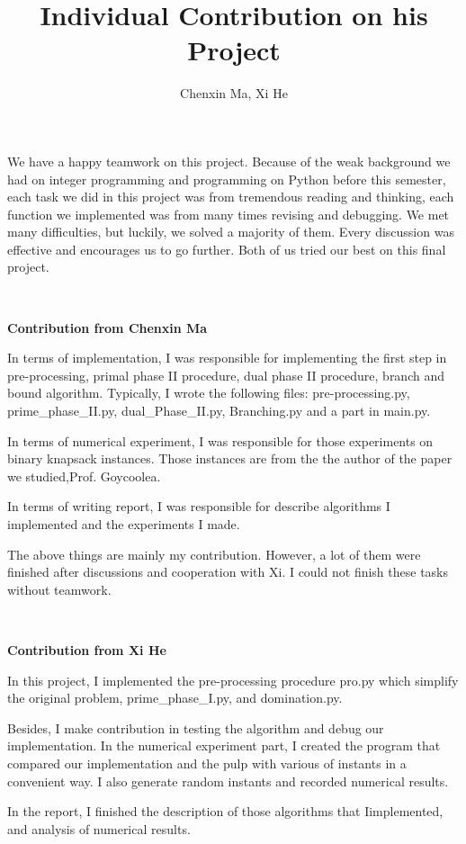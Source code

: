 \documentclass[a4paper,10pt]{article}
\title{Individual Contribution on his Project}
\author{Chenxin Ma, Xi He}
\begin{document}
\maketitle
 
We have a happy teamwork on this project. Because of the weak background we had on integer programming and programming on Python before this semester, each task we did in this project was from tremendous reading and thinking, each function we implemented was from many times revising and debugging. We met many difficulties, but luckily, we solved a majority of them. Every discussion was effective and encourages us to go further.  Both of us tried our best on this final project.   

~\\
\centerline{\textbf{Contribution from Chenxin Ma}}

In terms of implementation, I was responsible for implementing the first step in pre-processing, primal phase II procedure, dual phase II procedure, branch and bound algorithm. Typically, I wrote the following files: pre-processing.py, prime\_phase\_II.py, dual\_Phase\_II.py, Branching.py and a part in main.py. 

In terms of numerical experiment, I was responsible for those experiments on binary knapsack instances. Those instances are from the the author of the paper we studied,Prof. Goycoolea. 

In terms of writing report, I was responsible for describe algorithms I implemented and the experiments I made. 

The above things are mainly my contribution. However, a lot of them were finished after discussions and cooperation with Xi. I could not finish these tasks without teamwork. 

~\\
\centerline{\textbf{Contribution from Xi He}}
 
In this project, I implemented the pre-processing procedure pro.py which simplify the original problem, prime\_phase\_I.py, and domination.py. 

Besides, I make contribution in testing the algorithm and debug our implementation. In the numerical experiment part, I created the program that compared our implementation and the pulp with various of instants in a convenient way. I also generate random instants and recorded numerical results. 

In the report, I finished the description of those algorithms that Iimplemented, and analysis of numerical results. 
\end{document}

